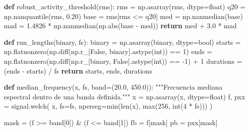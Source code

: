 \documentclass[
  spanish,
  a4paper,
  DIV=11,
  numbers=noendperiod]{scrreprt}
\newenvironment{Shaded}{\begin{snugshade}}{\end{snugshade}}
\newcommand{\BuiltInTok}[1]{\textcolor[rgb]{0.00,0.23,0.31}{#1}}
\newcommand{\CommentTok}[1]{\textcolor[rgb]{0.37,0.37,0.37}{#1}}
\newcommand{\ControlFlowTok}[1]{\textcolor[rgb]{0.00,0.23,0.31}{\textbf{#1}}}
\newcommand{\DecValTok}[1]{\textcolor[rgb]{0.68,0.00,0.00}{#1}}
\newcommand{\FloatTok}[1]{\textcolor[rgb]{0.68,0.00,0.00}{#1}}
\newcommand{\KeywordTok}[1]{\textcolor[rgb]{0.00,0.23,0.31}{\textbf{#1}}}
\newcommand{\NormalTok}[1]{\textcolor[rgb]{0.00,0.23,0.31}{#1}}
\newcommand{\OperatorTok}[1]{\textcolor[rgb]{0.37,0.37,0.37}{#1}}
\newcommand{\VariableTok}[1]{\textcolor[rgb]{0.07,0.07,0.07}{#1}}
\begin{document}
\begin{Shaded}
\begin{Highlighting}[]
\KeywordTok{def}\NormalTok{ robust\_activity\_threshold(rms):}
\NormalTok{    rms }\OperatorTok{=}\NormalTok{ np.asarray(rms, dtype}\OperatorTok{=}\BuiltInTok{float}\NormalTok{)}
\NormalTok{    q20 }\OperatorTok{=}\NormalTok{ np.nanquantile(rms, }\FloatTok{0.20}\NormalTok{)}
\NormalTok{    base }\OperatorTok{=}\NormalTok{ rms[rms }\OperatorTok{\textless{}=}\NormalTok{ q20]}
\NormalTok{    med }\OperatorTok{=}\NormalTok{ np.nanmedian(base)}
\NormalTok{    mad }\OperatorTok{=} \FloatTok{1.4826} \OperatorTok{*}\NormalTok{ np.nanmedian(np.}\BuiltInTok{abs}\NormalTok{(base }\OperatorTok{{-}}\NormalTok{ med))}
    \ControlFlowTok{return}\NormalTok{ med }\OperatorTok{+} \FloatTok{3.0} \OperatorTok{*}\NormalTok{ mad}


\KeywordTok{def}\NormalTok{ run\_lengths(binary, fs):}
\NormalTok{    binary }\OperatorTok{=}\NormalTok{ np.asarray(binary, dtype}\OperatorTok{=}\BuiltInTok{bool}\NormalTok{)}
\NormalTok{    starts }\OperatorTok{=}\NormalTok{ np.flatnonzero(np.diff(np.r\_[}\VariableTok{False}\NormalTok{, binary].astype(}\BuiltInTok{int}\NormalTok{)) }\OperatorTok{==} \DecValTok{1}\NormalTok{)}
\NormalTok{    ends }\OperatorTok{=}\NormalTok{ np.flatnonzero(np.diff(np.r\_[binary, }\VariableTok{False}\NormalTok{].astype(}\BuiltInTok{int}\NormalTok{)) }\OperatorTok{==} \OperatorTok{{-}}\DecValTok{1}\NormalTok{) }\OperatorTok{+} \DecValTok{1}
\NormalTok{    durations }\OperatorTok{=}\NormalTok{ (ends }\OperatorTok{{-}}\NormalTok{ starts) }\OperatorTok{/}\NormalTok{ fs}
    \ControlFlowTok{return}\NormalTok{ starts, ends, durations}


\KeywordTok{def}\NormalTok{ median\_frequency(x, fs, band}\OperatorTok{=}\NormalTok{(}\FloatTok{20.0}\NormalTok{, }\FloatTok{450.0}\NormalTok{)):}
    \CommentTok{"""Frecuencia mediana espectral dentro de una banda definida."""}
\NormalTok{    x }\OperatorTok{=}\NormalTok{ np.asarray(x, dtype}\OperatorTok{=}\BuiltInTok{float}\NormalTok{)}
\NormalTok{    f, pxx }\OperatorTok{=}\NormalTok{ signal.welch(}
\NormalTok{        x,}
\NormalTok{        fs}\OperatorTok{=}\NormalTok{fs,}
\NormalTok{        nperseg}\OperatorTok{=}\BuiltInTok{min}\NormalTok{(}\BuiltInTok{len}\NormalTok{(x), }\BuiltInTok{max}\NormalTok{(}\DecValTok{256}\NormalTok{, }\BuiltInTok{int}\NormalTok{(}\DecValTok{4} \OperatorTok{*}\NormalTok{ fs)))}
\NormalTok{    )}

\NormalTok{    mask }\OperatorTok{=}\NormalTok{ (f }\OperatorTok{\textgreater{}=}\NormalTok{ band[}\DecValTok{0}\NormalTok{]) }\OperatorTok{\&}\NormalTok{ (f }\OperatorTok{\textless{}=}\NormalTok{ band[}\DecValTok{1}\NormalTok{])}
\NormalTok{    fb }\OperatorTok{=}\NormalTok{ f[mask]}
\NormalTok{    pb }\OperatorTok{=}\NormalTok{ pxx[mask]}


\end{Highlighting}
\end{Shaded}
\end{document}

